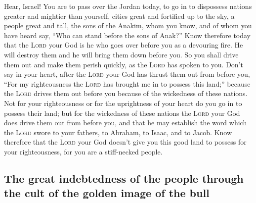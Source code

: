  Hear, Israel! You are to pass over the Jordan today, to
go in to dispossess nations greater and mightier than yourself, cities
great and fortified up to the sky,  a people great and
tall, the sons of the Anakim, whom you know, and of whom you have heard
say, ``Who can stand before the sons of Anak?''  Know
therefore today that the \textsc{Lord} your God is he who goes over
before you as a devouring fire. He will destroy them and he will bring
them down before you. So you shall drive them out and make them perish
quickly, as the \textsc{Lord} has spoken to you.  Don't
say in your heart, after the \textsc{Lord} your God has thrust them out
from before you, ``For my righteousness the \textsc{Lord} has brought me
in to possess this land;'' because the \textsc{Lord} drives them out
before you because of the wickedness of these nations. 
Not for your righteousness or for the uprightness of your heart do you
go in to possess their land; but for the wickedness of these nations the
\textsc{Lord} your God does drive them out from before you, and that he
may establish the word which the \textsc{Lord} swore to your fathers, to
Abraham, to Isaac, and to Jacob.  Know therefore that the
\textsc{Lord} your God doesn't give you this good land to possess for
your righteousness, for you are a stiff-necked people.

\hypertarget{the-great-indebtedness-of-the-people-through-the-cult-of-the-golden-image-of-the-bull}{%
\subsection{The great indebtedness of the people through the cult of the
golden image of the
bull}\label{the-great-indebtedness-of-the-people-through-the-cult-of-the-golden-image-of-the-bull}}

